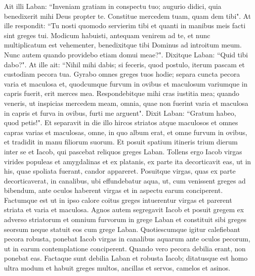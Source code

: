 \begin{biblechapter}
\verse Ait illi Laban: “Inveniam gratiam in conspectu tuo; augurio didici, quia benedixerit mihi Deus propter te. 
\verse Constitue mercedem tuam, quam dem tibi". 
\verse At ille respondit: “Tu nosti quomodo servierim tibi et quanti in manibus meis facti sint greges tui. 
\verse Modicum habuisti, antequam venirem ad te, et nunc multiplicatum est vehementer, benedixitque tibi Dominus ad introitum meum. Nunc autem quando providebo etiam domui meae?". 
\verse Dixitque Laban: “Quid tibi dabo?". At ille ait: “Nihil mihi dabis; si feceris, quod postulo, iterum pascam et custodiam pecora tua. 
\verse Gyrabo omnes greges tuos hodie; separa cuncta pecora varia et maculosa et, quodcumque furvum in ovibus et maculosum variumque in capris fuerit, erit merces mea. 
\verse Respondebitque mihi cras iustitia mea; quando veneris, ut inspicias mercedem meam, omnia, quae non fuerint varia et maculosa in capris et furva in ovibus, furti me arguent". 
\verse Dixit Laban: “Gratum habeo, quod petis!". 
\verse Et separavit in die illo hircos striatos atque maculosos et omnes capras varias et maculosas, omne, in quo album erat, et omne furvum in ovibus, et tradidit in manu filiorum suorum. 
\verse Et posuit spatium itineris trium dierum inter se et Iacob, qui pascebat reliquos greges Laban. 
\verse Tollens ergo Iacob virgas virides populeas et amygdalinas et ex platanis, ex parte ita decorticavit eas, ut in his, quae spoliata fuerant, candor appareret. 
\verse Posuitque virgas, quas ex parte decorticaverat, in canalibus, ubi effundebatur aqua, ut, cum venissent greges ad bibendum, ante oculos haberent virgas et in aspectu earum conciperent. 
\verse Factumque est ut in ipso calore coitus greges intuerentur virgas et parerent striata et varia et maculosa. 
\verse Agnos autem segregavit Iacob et posuit gregem ex adverso striatorum et omnium furvorum in grege Laban et constituit sibi greges seorsum neque statuit eos cum grege Laban. 
\verse Quotiescumque igitur calefiebant pecora robusta, ponebat Iacob virgas in canalibus aquarum ante oculos pecorum, ut in earum contemplatione conciperent. 
\verse Quando vero pecora debilia erant, non ponebat eas. Factaque sunt debilia Laban et robusta Iacob; 
\verse ditatusque est homo ultra modum et habuit greges multos, ancillas et servos, camelos et asinos. 
\end{biblechapter}


